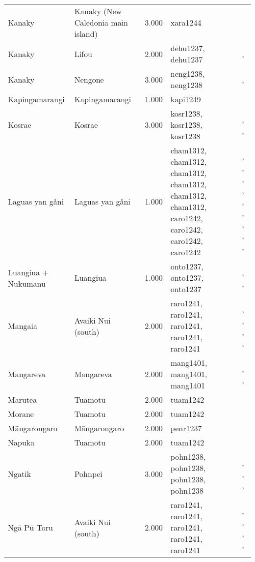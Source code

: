 \begin{longtable}{p{1.8cm}p{1.8cm}p{1.8cm}p{2cm}p{7cm}}
  Kanaky & Kanaky (New Caledonia main island) & 3.000 & xara1244 & \citet{young1991goodenough} \\ 
  Kanaky & Lifou & 2.000 & dehu1237, dehu1237 & \citet{hadfield_1920}, \citet{ray1917people} \\ 
  Kanaky & Nengone & 3.000 & neng1238, neng1238 & \citet{dubois1984gens}, \citet{guiart1952organisation} \\ 
  Kapingamarangi & Kapingamarangi & 1.000 & kapi1249 & \citet{buck1950} \\ 
  Kosrae & Kosrae & 3.000 & kosr1238, kosr1238, kosr1238 & \citet{athens2007prehistoric}, \citet{graves1986late}, \citet{peoples1991} \\ 
  Laguas yan gåni & Laguas yan gåni & 1.000 & cham1312, cham1312, cham1312, cham1312, cham1312, cham1312, caro1242, caro1242, caro1242, caro1242 & \citet{cordy1983social}, \citet{cordy1983social}, \citet{cordy1983social}, \citet{thompson_1971}, \citet{thompson_1971}, \citet{thompson_1971}, \citet{josephandmurray1951}, \citet{josephandmurray1951}, \citet{spehr1954}, \citet{spehr1954} \\ 
  Luangiua + Nukumanu & Luangiua & 1.000 & onto1237, onto1237, onto1237 & \citet{sahlins1958social}, \citet{bayliss1974constraints}, \citet{donner1991} \\ 
  Mangaia & Avaiki Nui (south) & 2.000 & raro1241, raro1241, raro1241, raro1241, raro1241 & \citet{bellwood1971varieties}, \citet{buck1934}, \citet{crocombe_1967}, \citet{hayes1981cook}, \citet{walter1996} \\ 
  Mangareva & Mangareva & 2.000 & mang1401, mang1401, mang1401 & \citet{buck1938}, \citet{conte2004archaeological}, \citet{green2000mangarevan} \\ 
  Marutea & Tuamotu & 2.000 & tuam1242 & \citet{emory1975material} \\ 
  Morane & Tuamotu & 2.000 & tuam1242 & \citet{emory1975material} \\ 
  Māngarongaro & Māngarongaro & 2.000 & penr1237 & \citet{buck1932b} \\ 
  Napuka & Tuamotu & 2.000 & tuam1242 & \citet{emory1975material} \\ 
  Ngatik & Pohnpei & 3.000 & pohn1238, pohn1238, pohn1238, pohn1238 & \citet{hanlon2019upon}, \citet{haun1984prehistoric}, \citet{raynor1991indigenous}, \citet{riesenberg1968native} \\ 
  Ngā Pū Toru & Avaiki Nui (south) & 2.000 & raro1241, raro1241, raro1241, raro1241, raro1241 & \citet{bellwood1971varieties}, \citet{buck1934}, \citet{crocombe_1967}, \citet{hayes1981cook}, \citet{walter1996} \\ 

\end{longtable}

